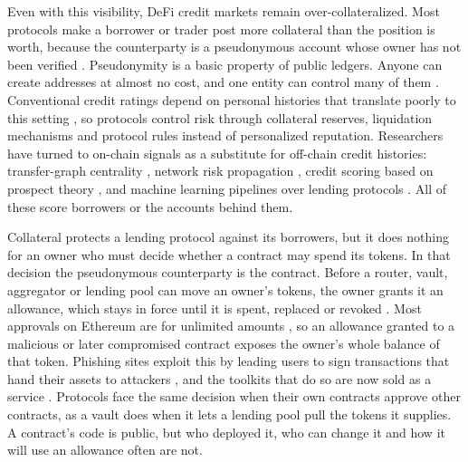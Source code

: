 Even with this visibility, DeFi credit markets remain over-collateralized. Most protocols make a borrower or trader post more collateral than the position is worth, because the counterparty is a pseudonymous account whose owner has not been verified \parencite{harvey2021defi}. Pseudonymity is a basic property of public ledgers. Anyone can create addresses at almost no cost, and one entity can control many of them \parencite{douceur2002sybil}. Conventional credit ratings depend on personal histories that translate poorly to this setting \parencite{packin2024credit}, so protocols control risk through collateral reserves, liquidation mechanisms and protocol rules instead of personalized reputation. Researchers have turned to on-chain signals as a substitute for off-chain credit histories: transfer-graph centrality \parencite{do2023hodgerank}, network risk propagation \parencite{lin2025riskprop}, credit scoring based on prospect theory \parencite{hassija2020lending}, and machine learning pipelines over lending protocols \parencite{kotb2023credit}. All of these score borrowers or the accounts behind them.

Collateral protects a lending protocol against its borrowers, but it does nothing for an owner who must decide whether a contract may spend its tokens. In that decision the pseudonymous counterparty is the contract. Before a router, vault, aggregator or lending pool can move an owner's tokens, the owner grants it an allowance, which stays in force until it is spent, replaced or revoked \parencite{vogelsteller2015erc20}. Most approvals on Ethereum are for unlimited amounts \parencite{wang2022unlimited}, so an allowance granted to a malicious or later compromised contract exposes the owner's whole balance of that token. Phishing sites exploit this by leading users to sign transactions that hand their assets to attackers \parencite{he2023txphishscope}, and the toolkits that do so are now sold as a service \parencite{he2025drainer}. Protocols face the same decision when their own contracts approve other contracts, as a vault does when it lets a lending pool pull the tokens it supplies. A contract's code is public, but who deployed it, who can change it and how it will use an allowance often are not.

